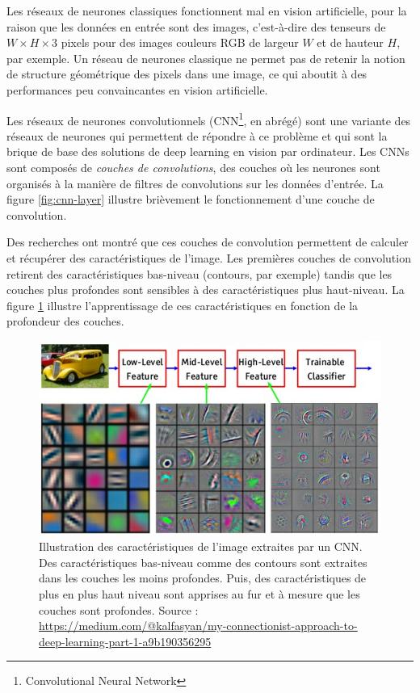 Les réseaux de neurones classiques fonctionnent mal en vision artificielle, pour la raison que les données en entrée sont des images, c'est-à-dire des tenseurs de $W \times H \times 3$ pixels pour des images couleurs RGB de largeur $W$ et de hauteur $H$, par exemple. Un réseau de neurones classique ne permet pas de retenir la notion de structure géométrique des pixels dans une image, ce qui aboutit à des performances peu convaincantes en vision artificielle.

Les réseaux de neurones convolutionnels (CNN\footnote{Convolutional Neural Network}, en abrégé) sont une variante des réseaux de neurones qui permettent de répondre à ce problème et qui sont la brique de base des solutions de deep learning en vision par ordinateur. Les CNNs sont composés de \textit{couches de convolutions}, des couches où les neurones sont organisés à la manière de filtres de convolutions sur les données d'entrée. La figure \ref{fig:cnn-layer} illustre brièvement le fonctionnement d'une couche de convolution.

Des recherches \cite{CNN-visu} ont montré que ces couches de convolution permettent de calculer et récupérer des caractéristiques de l'image. Les premières couches de convolution retirent des caractéristiques bas-niveau (contours, par exemple) tandis que les couches plus profondes sont sensibles à des caractéristiques plus haut-niveau. La figure \ref{fig:features-cnn} illustre l'apprentissage de ces caractéristiques en fonction de la profondeur des couches.

\begin{figure}[!h]
\centering
\includegraphics[scale=0.4]{img/cnn-vizzzz.png}
\caption{Illustration des caractéristiques de l'image extraites par un CNN. Des caractéristiques bas-niveau comme des contours sont extraites dans les couches les moins profondes. Puis, des caractéristiques de plus en plus haut niveau sont apprises au fur et à mesure que les couches sont profondes. Source : \url{https://medium.com/@kalfasyan/my-connectionist-approach-to-deep-learning-part-1-a9b190356295}}
\label{fig:features-cnn}
\end{figure}

